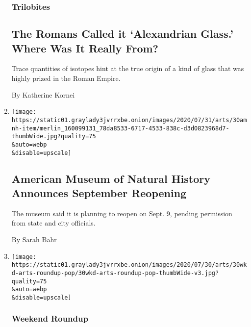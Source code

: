\begin{enumerate}
  \hypertarget{trilobites}{%
  \subsubsection{Trilobites}\label{trilobites}}

  \hypertarget{the-romans-called-it-alexandrian-glass-where-was-it-really-from}{%
  \subsection{The Romans Called it `Alexandrian Glass.' Where Was It
  Really
  From?}\label{the-romans-called-it-alexandrian-glass-where-was-it-really-from}}

  Trace quantities of isotopes hint at the true origin of a kind of
  glass that was highly prized in the Roman Empire.

  By Katherine Kornei
\item
  \href{/2020/07/30/arts/design/american-museum-of-natural-history-reopen-covid.html}{}

  \texttt{[image: https://static01.graylady3jvrrxbe.onion/images/2020/07/31/arts/30amnh-item/merlin\_160099131\_78da8533-6717-4533-838c-d3d0823968d7-thumbWide.jpg?quality=75\\\&auto=webp\\\&disable=upscale]}

  \hypertarget{american-museum-of-natural-history-announces-september-reopening}{%
  \subsection{American Museum of Natural History Announces September
  Reopening}\label{american-museum-of-natural-history-announces-september-reopening}}

  The museum said it is planning to reopen on Sept. 9, pending
  permission from state and city officials.

  By Sarah Bahr
\item
  \href{/2020/07/30/arts/things-to-do-weekend-coronavirus.html}{}

  \texttt{[image: https://static01.graylady3jvrrxbe.onion/images/2020/07/30/arts/30wkd-arts-roundup-pop/30wkd-arts-roundup-pop-thumbWide-v3.jpg?quality=75\\\&auto=webp\\\&disable=upscale]}

  \hypertarget{weekend-roundup}{%
  \subsubsection{Weekend Roundup}\label{weekend-roundup}}

  \hypertarget{7-things-to-do-this-weekend}{%
}
\end{enumerate}
